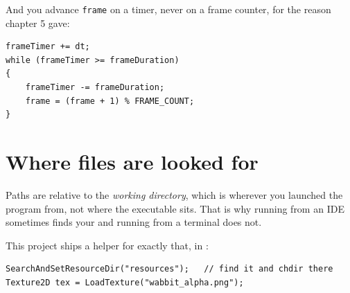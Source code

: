 And you advance \lstinline|frame| on a timer, never on a frame counter, for the
reason chapter 5 gave:

\begin{lstlisting}
frameTimer += dt;
while (frameTimer >= frameDuration)
{
    frameTimer -= frameDuration;
    frame = (frame + 1) % FRAME_COUNT;
}
\end{lstlisting}


\section{Where files are looked for}

Paths are relative to the \emph{working directory}, which is wherever you
launched the program from, not where the executable sits. That is why running
from an IDE sometimes finds your  and running from a terminal does
not.

This project ships a helper for exactly that, in :

\begin{lstlisting}
SearchAndSetResourceDir("resources");   // find it and chdir there
Texture2D tex = LoadTexture("wabbit_alpha.png");
\end{lstlisting}


